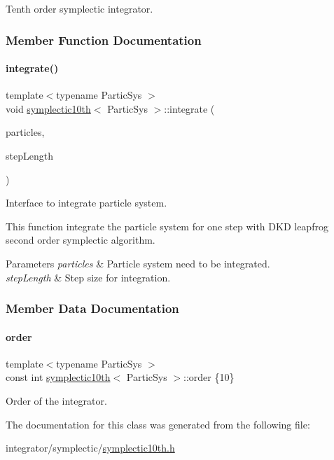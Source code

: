 Tenth order symplectic integrator. 

\subsubsection{Member Function Documentation}
\mbox{\label{classsymplectic10th_a6fd1d57c1504d7a603056ca021b179b0}} 
\paragraph{\texorpdfstring{integrate()}{integrate()}}
{\footnotesize\ttfamily template$<$typename Partic\+Sys $>$ \\
void \mbox{\hyperlink{classsymplectic10th}{symplectic10th}}$<$ Partic\+Sys $>$\+::integrate (\begin{DoxyParamCaption}\item[{Partic\+Sys \&}]{particles,  }\item[{double}]{step\+Length }\end{DoxyParamCaption})}



Interface to integrate particle system. 

This function integrate the particle system for one step with D\+KD leapfrog second order symplectic algorithm. 
\begin{DoxyParams}{Parameters}
{\em particles} & Particle system need to be integrated. \\
\hline
{\em step\+Length} & Step size for integration. \\
\hline
\end{DoxyParams}


\subsubsection{Member Data Documentation}
\mbox{\label{classsymplectic10th_af1cb88e94e3022b5bf90091d03c609a4}} 
\paragraph{\texorpdfstring{order}{order}}
{\footnotesize\ttfamily template$<$typename Partic\+Sys $>$ \\
const int \mbox{\hyperlink{classsymplectic10th}{symplectic10th}}$<$ Partic\+Sys $>$\+::order \{10\}\hspace{0.3cm}{\ttfamily [static]}}



Order of the integrator. 



The documentation for this class was generated from the following file\+:\begin{DoxyCompactItemize}
\item 
integrator/symplectic/\mbox{\hyperlink{symplectic10th_8h}{symplectic10th.\+h}}\end{DoxyCompactItemize}
